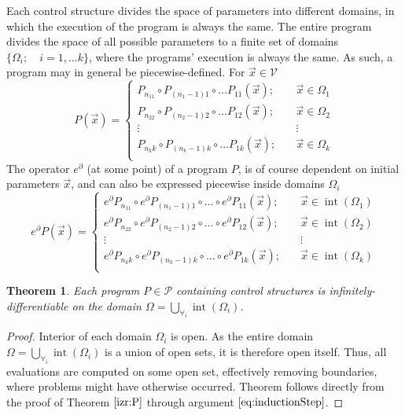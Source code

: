 \documentclass[smallcondensed]{svjour3}
\newcommand{\VV}{\mathcal{V}}
\newcommand{\dP}{\mathcal{P}}
\newcommand{\D}{\partial}
\DeclareMathOperator{\interior}{int}
\newtheorem{izrek}{Theorem}[section]
\begin{document}
 Each control structure divides the space of parameters into different domains, in which the execution of the program is always the same. The entire program divides the space of all possible parameters to a finite set of domains $\{\Omega_i;\quad i=1,\ldots
  k\}$, where the programs' execution is always the same. As such, a program may in general be piecewise-defined. For $\vec{x}\in\VV$
 \begin{equation}
   \label{eq:zlrprk_splosno}
   P(\vec{x}) =
   \begin{cases}
     P_{n_11}\circ P_{(n_1-1)1}\circ\ldots P_{11}(\vec{x});&\quad \vec{x}\in\Omega_1\\
     P_{n_22}\circ P_{(n_2-1)2}\circ\ldots P_{12}(\vec{x});&\quad \vec{x}\in\Omega_2\\
     \vdots&\quad\vdots\\
     P_{n_kk}\circ P_{(n_k-1)k}\circ\ldots P_{1k}(\vec{x});&\quad \vec{x}\in\Omega_k\\
   \end{cases}
 \end{equation}
 The operator $e^\D$ (at some point) of a program $P$, is of course dependent on initial parameters $\vec{x}$, and can also be expressed piecewise inside domains $\Omega_i$
 \begin{equation}
   \label{eq:Dzlrprk_splosno}
   e^\D P({\vec{x}}) =
   \begin{cases}
     e^\D P_{n_11}\circ e^\D P_{(n_1-1)1}\circ\ldots\circ e^\D P_{11}(\vec{x});&\quad \vec{x}\in\interior(\Omega_1)\\
     e^\D P_{n_22}\circ e^\D P_{(n_2-1)2}\circ\ldots\circ e^\D P_{12}(\vec{x});&\quad \vec{x}\in\interior(\Omega_2)\\
     \vdots&\quad\vdots\\
     e^\D P_{n_kk}\circ e^\D P_{(n_k-1)k}\circ\ldots\circ e^\D P_{1k}(\vec{x});&\quad \vec{x}\in\interior(\Omega_k)\\
   \end{cases}
 \end{equation}

 \begin{izrek}\label{izr:diferentiableOnDomain}
 Each program $P\in\dP$ containing control structures is infinitely-differentiable on the domain $\Omega=\bigcup\limits_{\forall_i}\interior(\Omega_i)$.
 \end{izrek}
 \begin{proof}
  Interior of each domain $\Omega_i$ is open. As the entire domain $\Omega=\bigcup\limits_{\forall_i}\interior(\Omega_i)$ is a union of open sets, it is therefore open itself. Thus, all evaluations are computed on some open set, effectively removing boundaries, where problems might have otherwise occurred. Theorem follows directly from the proof of Theorem $\ref{izr:P}$ through argument $\eqref{eq:inductionStep}$.
 \end{proof}
 
\end{document}
